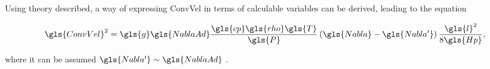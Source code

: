 Using theory described, a way of expressing \gls{ConvVel} in terms of calculable variables can be derived, leading to the equation

\begin{equation}
    \gls{ConvVel}^2=\gls{g} \gls{NablaAd}\frac{\gls{cp}\gls{rho} \gls{T}}{\gls{P}} \left(\gls{Nabla} -\gls{Nabla'}\right)\frac{\gls{l}^2}{8\gls{Hp}},
    \label{eq:ManualVelocityCalc}
\end{equation}

where it can be assumed $\gls{Nabla'}\sim \gls{NablaAd}$ \citep{Maeder09}.